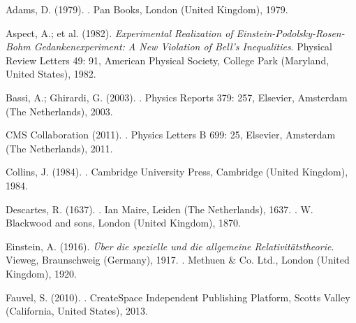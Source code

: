 \begin{thebibliography}{99}

 Adams, D. (1979). . Pan Books, London (United Kingdom), 1979.

 Aspect, A.; et al. (1982). \textit{Experimental Realization of Einstein-Podolsky-Rosen-Bohm Gedankenexperiment: A New Violation of Bell's Inequalities}. Physical Review Letters 49: 91, American Physical Society, College Park (Maryland, United States), 1982.

 Bassi, A.; Ghirardi, G. (2003). . Physics Reports 379: 257, Elsevier, Amsterdam (The Netherlands), 2003.

 CMS Collaboration (2011). . Physics Letters B 699: 25, Elsevier, Amsterdam (The Netherlands), 2011.

 Collins, J. (1984). . Cambridge University Press, Cambridge (United Kingdom), 1984.

 Descartes, R. (1637). . Ian Maire, Leiden (The Netherlands), 1637. . W. Blackwood and sons, London (United Kingdom), 1870.

 Einstein, A. (1916). \textit{Über die spezielle und die allgemeine Relativitätstheorie}. Vieweg, Braunschweig (Germany), 1917. . Methuen \& Co. Ltd., London (United Kingdom), 1920.

 Fauvel, S. (2010). . CreateSpace Independent Publishing Platform, Scotts Valley (California, United States), 2013.


\end{thebibliography}
